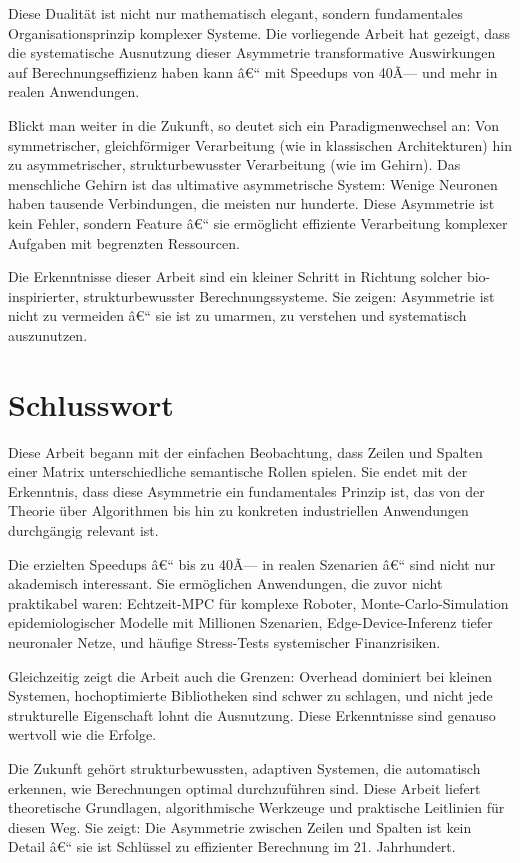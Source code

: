 ﻿\documentclass[a4paper,12pt]{report}
\theoremstyle{definition}
\begin{document}
	Diese Dualität ist nicht nur mathematisch elegant, sondern fundamentales Organisationsprinzip komplexer Systeme. Die vorliegende Arbeit hat gezeigt, dass die systematische Ausnutzung dieser Asymmetrie transformative Auswirkungen auf Berechnungseffizienz haben kann â€“ mit Speedups von 40Ã— und mehr in realen Anwendungen.
	
	Blickt man weiter in die Zukunft, so deutet sich ein Paradigmenwechsel an: Von symmetrischer, gleichförmiger Verarbeitung (wie in klassischen Architekturen) hin zu asymmetrischer, strukturbewusster Verarbeitung (wie im Gehirn). Das menschliche Gehirn ist das ultimative asymmetrische System: Wenige Neuronen haben tausende Verbindungen, die meisten nur hunderte. Diese Asymmetrie ist kein Fehler, sondern Feature â€“ sie ermöglicht effiziente Verarbeitung komplexer Aufgaben mit begrenzten Ressourcen.
	
	Die Erkenntnisse dieser Arbeit sind ein kleiner Schritt in Richtung solcher bio-inspirierter, strukturbewusster Berechnungssysteme. Sie zeigen: Asymmetrie ist nicht zu vermeiden â€“ sie ist zu umarmen, zu verstehen und systematisch auszunutzen.
	
	\section{Schlusswort}
	
	Diese Arbeit begann mit der einfachen Beobachtung, dass Zeilen und Spalten einer Matrix unterschiedliche semantische Rollen spielen. Sie endet mit der Erkenntnis, dass diese Asymmetrie ein fundamentales Prinzip ist, das von der Theorie über Algorithmen bis hin zu konkreten industriellen Anwendungen durchgängig relevant ist.
	
	Die erzielten Speedups â€“ bis zu 40Ã— in realen Szenarien â€“ sind nicht nur akademisch interessant. Sie ermöglichen Anwendungen, die zuvor nicht praktikabel waren: Echtzeit-MPC für komplexe Roboter, Monte-Carlo-Simulation epidemiologischer Modelle mit Millionen Szenarien, Edge-Device-Inferenz tiefer neuronaler Netze, und häufige Stress-Tests systemischer Finanzrisiken.
	
	Gleichzeitig zeigt die Arbeit auch die Grenzen: Overhead dominiert bei kleinen Systemen, hochoptimierte Bibliotheken sind schwer zu schlagen, und nicht jede strukturelle Eigenschaft lohnt die Ausnutzung. Diese Erkenntnisse sind genauso wertvoll wie die Erfolge.
	
	Die Zukunft gehört strukturbewussten, adaptiven Systemen, die automatisch erkennen, wie Berechnungen optimal durchzuführen sind. Diese Arbeit liefert theoretische Grundlagen, algorithmische Werkzeuge und praktische Leitlinien für diesen Weg. Sie zeigt: Die Asymmetrie zwischen Zeilen und Spalten ist kein Detail â€“ sie ist Schlüssel zu effizienter Berechnung im 21. Jahrhundert.
	
\end{document}

